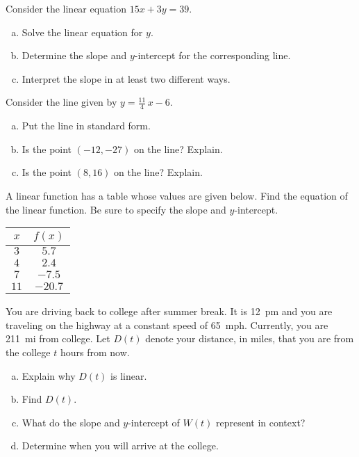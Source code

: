 \documentclass[11pt,letterpaper]{article}
\begin{document}
\prob Consider the linear equation $15x + 3y= 39$. 
        \begin{enumerate}[(a)]
        \item Solve the linear equation for $y$. 
        \item Determine the slope and $y$-intercept for the corresponding line.
        \item Interpret the slope in at least two different ways. 
        \end{enumerate} \pspace


\prob Consider the line given by $y= \frac{11}{4}\,x - 6$.
        \begin{enumerate}[(a)]
        \item Put the line in standard form.
        \item Is the point $(-12, -27)$ on the line? Explain.
        \item Is the point $(8, 16)$ on the line? Explain. 
        \end{enumerate} \pspace


\prob A linear function has a table whose values are given below. Find the equation of the linear function. Be sure to specify the slope and $y$-intercept.
	\begin{table}[H]
	\centering
	\begin{tabular}{c|c}
	$x$ & $f(x)$ \\ \hline
	$3$ & $5.7$ \\ 
	$4$ & $2.4$ \\
	$7$ & $-7.5$ \\
	$11$ & $-20.7$
	\end{tabular}
	\end{table} \pspace


\prob You are driving back to college after summer break. It is 12~pm and you are traveling on the highway at a constant speed of 65~mph. Currently, you are 211~mi from college. Let $D(t)$ denote your distance, in miles, that you are from the college $t$ hours from now. 
	\begin{enumerate}[(a)]
	\item Explain why $D(t)$ is linear.
	\item Find $D(t)$. 
	\item What do the slope and $y$-intercept of $W(t)$ represent in context?
	\item Determine when you will arrive at the college. 
	\end{enumerate} \pspace
\end{document}
